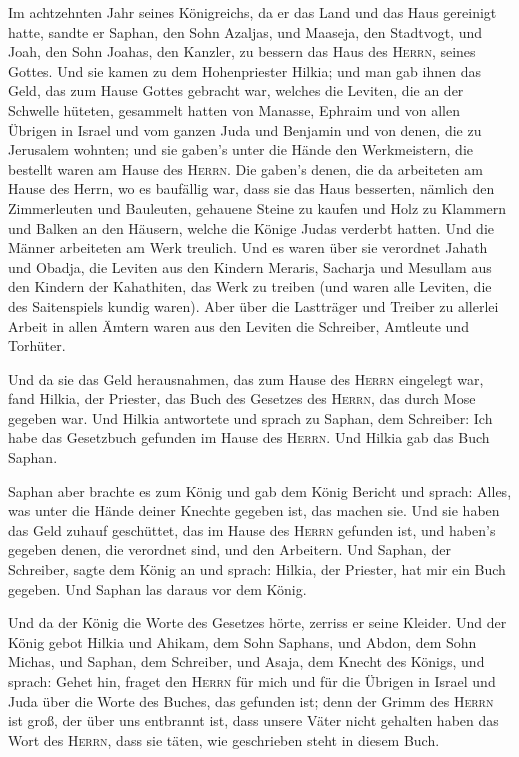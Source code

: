  Im achtzehnten Jahr seines Königreichs, da er das Land
und das Haus gereinigt hatte, sandte er Saphan, den Sohn Azaljas, und
Maaseja, den Stadtvogt, und Joah, den Sohn Joahas, den Kanzler, zu
bessern das Haus des \textsc{Herrn}, seines Gottes.  Und
sie kamen zu dem Hohenpriester Hilkia; und man gab ihnen das Geld, das
zum Hause Gottes gebracht war, welches die Leviten, die an der Schwelle
hüteten, gesammelt hatten von Manasse, Ephraim und von allen Übrigen in
Israel und vom ganzen Juda und Benjamin und von denen, die zu Jerusalem
wohnten;  und sie gaben's unter die Hände den
Werkmeistern, die bestellt waren am Hause des \textsc{Herrn}. Die
gaben's denen, die da arbeiteten am Hause des Herrn, wo es baufällig
war, dass sie das Haus besserten,  nämlich den
Zimmerleuten und Bauleuten, gehauene Steine zu kaufen und Holz zu
Klammern und Balken an den Häusern, welche die Könige Judas verderbt
hatten.  Und die Männer arbeiteten am Werk treulich. Und
es waren über sie verordnet Jahath und Obadja, die Leviten aus den
Kindern Meraris, Sacharja und Mesullam aus den Kindern der Kahathiten,
das Werk zu treiben (und waren alle Leviten, die des Saitenspiels kundig
waren).  Aber über die Lastträger und Treiber zu allerlei
Arbeit in allen Ämtern waren aus den Leviten die Schreiber, Amtleute und
Torhüter.

 Und da sie das Geld herausnahmen, das zum Hause des
\textsc{Herrn} eingelegt war, fand Hilkia, der Priester, das Buch des
Gesetzes des \textsc{Herrn}, das durch Mose gegeben war. 
Und Hilkia antwortete und sprach zu Saphan, dem Schreiber: Ich habe das
Gesetzbuch gefunden im Hause des \textsc{Herrn}. Und Hilkia gab das Buch
Saphan.

 Saphan aber brachte es zum König und gab dem König
Bericht und sprach: Alles, was unter die Hände deiner Knechte gegeben
ist, das machen sie.  Und sie haben das Geld zuhauf
geschüttet, das im Hause des \textsc{Herrn} gefunden ist, und haben's
gegeben denen, die verordnet sind, und den Arbeitern. 
Und Saphan, der Schreiber, sagte dem König an und sprach: Hilkia, der
Priester, hat mir ein Buch gegeben. Und Saphan las daraus vor dem König.

 Und da der König die Worte des Gesetzes hörte, zerriss
er seine Kleider.  Und der König gebot Hilkia und Ahikam,
dem Sohn Saphans, und Abdon, dem Sohn Michas, und Saphan, dem Schreiber,
und Asaja, dem Knecht des Königs, und sprach:  Gehet hin,
fraget den \textsc{Herrn} für mich und für die Übrigen in Israel und
Juda über die Worte des Buches, das gefunden ist; denn der Grimm des
\textsc{Herrn} ist groß, der über uns entbrannt ist, dass unsere Väter
nicht gehalten haben das Wort des \textsc{Herrn}, dass sie täten, wie
geschrieben steht in diesem Buch.

